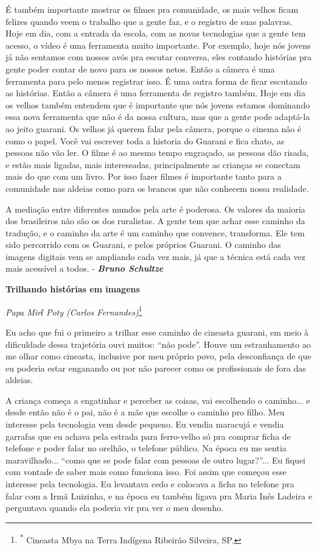 É também importante mostrar os filmes pra comunidade, os mais velhos
ficam felizes quando veem o trabalho que a gente faz, e o registro de
suas palavras. Hoje em dia, com a entrada da escola, com as novas
tecnologias que a gente tem acesso, o vídeo é uma ferramenta muito
importante. Por exemplo, hoje nós jovens já não sentamos com nossos avós
pra escutar conversa, eles contando histórias pra gente poder contar de
novo para os nossos netos. Então a câmera é uma ferramenta para pelo
menos registrar isso. É uma outra forma de ficar escutando as histórias.
Então a câmera é uma ferramenta de registro também. Hoje em dia os
velhos também entendem que é importante que nós jovens estamos dominando
essa nova ferramenta que não é da nossa cultura, mas que a gente pode
adaptá-la ao jeito guarani. Os velhos já querem falar pela câmera,
porque o cinema não é como o papel. Você vai escrever toda a historia do
Guarani e fica chato, as pessoas não vão ler. O filme é ao mesmo tempo
engraçado, as pessoas dão risada, e estão mais ligadas, mais
interessadas, principalmente as crianças se conectam mais do que com um
livro. Por isso fazer filmes é importante tanto para a comunidade nas
aldeias como para os brancos que não conhecem nossa realidade.

A mediação entre diferentes mundos pela arte é poderosa. Os valores da
maioria dos brasileiros não são os dos ruralistas. A gente tem que achar
esse caminho da tradução, e o caminho da arte é um caminho que convence,
transforma. Ele tem sido percorrido com os Guarani, e pelos próprios
Guarani. O caminho das imagens digitais vem se ampliando cada vez mais,
já que a técnica está cada vez mais acessível a todos. -
\emph{\textbf{Bruno Schultze }}

\textbf{Trilhando histórias em imagens}

\emph{Papa Mirῖ Poty (Carlos Fernandes)}\footnote{\textsuperscript{*}
  Cineasta Mbya na Terra Indígena Ribeirão Silveira, SP.}

Eu acho que fui o primeiro a trilhar esse caminho de cineasta guarani,
em meio à dificuldade dessa trajetória ouvi muitos: ``não pode''. Houve
um estranhamento ao me olhar como cineasta, inclusive por meu próprio
povo, pela desconfiança de que eu poderia estar enganando ou por não
parecer como os profissionais de fora das aldeias.

A criança começa a engatinhar e perceber as coisas, vai escolhendo o
caminho... e desde então não é o pai, não é a mãe que escolhe o caminho
pro filho. Meu interesse pela tecnologia vem desde pequeno. Eu vendia
maracujá e vendia garrafas que eu achava pela estrada para ferro-velho
só pra comprar ficha de telefone e poder falar no orelhão, o telefone
público. Na época eu me sentia maravilhado... ``como que se pode falar
com pessoas de outro lugar?''... Eu fiquei com vontade de saber mais
como funciona isso. Foi assim que começou esse interesse pela
tecnologia. Eu levantava cedo e colocava a ficha no telefone pra falar
com a Irmã Luizinha, e na época eu também ligava pra Maria Inês Ladeira
e perguntava quando ela poderia vir pra ver o meu desenho.

